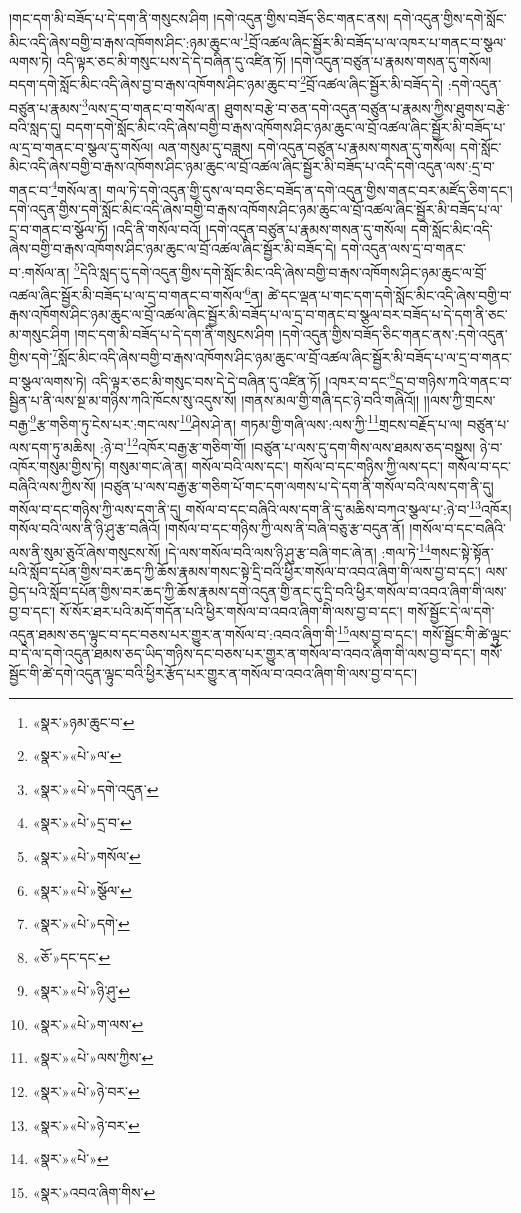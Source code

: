 །གང་དག་མི་བཟོད་པ་དེ་དག་ནི་གསུངས་ཤིག །དགེ་འདུན་གྱིས་བཟོད་ཅིང་གནང་ནས། དགེ་འདུན་གྱིས་དགེ་སློང་མིང་འདི་ཞེས་བགྱི་བ་རྒས་འཁོགས་ཤིང་:ཉམ་ཆུང་ལ་\footnote{«སྣར་»ཉམ་ཆུང་བ་}བྲོ་འཚལ་ཞིང་སྦྱོར་མི་བཟོད་པ་ལ་འཁར་པ་གནང་བ་སྩལ་ལགས་ཏེ། འདི་ལྟར་ཅང་མི་གསུང་པས་དེ་དེ་བཞིན་དུ་འཛིན་ཏོ། །དགེ་འདུན་བཙུན་པ་རྣམས་གསན་དུ་གསོལ། བདག་དགེ་སློང་མིང་འདི་ཞེས་བྱ་བ་རྒས་འཁོགས་ཤིང་ཉམ་ཆུང་བ་\footnote{«སྣར་»«པེ་»ལ་}བྲོ་འཚལ་ཞིང་སྦྱོར་མི་བཟོད་དེ། :དགེ་འདུན་བཙུན་པ་རྣམས་\footnote{«སྣར་»«པེ་»དགེ་འདུན་}ལས་དྲ་བ་གནང་བ་གསོལ་ན། ཐུགས་བརྩེ་བ་ཅན་དགེ་འདུན་བཙུན་པ་རྣམས་ཀྱིས་ཐུགས་བརྩེ་བའི་སླད་དུ། བདག་དགེ་སློང་མིང་འདི་ཞེས་བགྱི་བ་རྒས་འཁོགས་ཤིང་ཉམ་ཆུང་ལ་བྲོ་འཚལ་ཞིང་སྦྱོར་མི་བཟོད་པ་ལ་དྲ་བ་གནང་བ་སྩལ་དུ་གསོལ། ལན་གསུམ་དུ་བཟླས། དགེ་འདུན་བཙུན་པ་རྣམས་གསན་དུ་གསོལ། དགེ་སློང་མིང་འདི་ཞེས་བགྱི་བ་རྒས་འཁོགས་ཤིང་ཉམ་ཆུང་ལ་བྲོ་འཚལ་ཞིང་སྦྱོར་མི་བཟོད་པ་འདི་དགེ་འདུན་ལས་:དྲ་བ་གནང་བ་\footnote{«སྣར་»«པེ་»དྲ་བ་}གསོལ་ན། གལ་ཏེ་དགེ་འདུན་གྱི་དུས་ལ་བབ་ཅིང་བཟོད་ན་དགེ་འདུན་གྱིས་གནང་བར་མཛོད་ཅིག་དང་། དགེ་འདུན་གྱིས་དགེ་སློང་མིང་འདི་ཞེས་བགྱི་བ་རྒས་འཁོགས་ཤིང་ཉམ་ཆུང་ལ་བྲོ་འཚལ་ཞིང་སྦྱོར་མི་བཟོད་པ་ལ་དྲ་བ་གནང་བ་སྩོལ་ཏོ། །འདི་ནི་གསོལ་བའོ། །དགེ་འདུན་བཙུན་པ་རྣམས་གསན་དུ་གསོལ། དགེ་སློང་མིང་འདི་ཞེས་བགྱི་བ་རྒས་འཁོགས་ཤིང་ཉམ་ཆུང་ལ་བྲོ་འཚལ་ཞིང་སྦྱོར་མི་བཟོད་དེ། དགེ་འདུན་ལས་དྲ་བ་གནང་བ་:གསོལ་ན། \footnote{«སྣར་»«པེ་»གསོལ་}དེའི་སླད་དུ་དགེ་འདུན་གྱིས་དགེ་སློང་མིང་འདི་ཞེས་བགྱི་བ་རྒས་འཁོགས་ཤིང་ཉམ་ཆུང་ལ་བྲོ་འཚལ་ཞིང་སྦྱོར་མི་བཟོད་པ་ལ་དྲ་བ་གནང་བ་གསོལ་\footnote{«སྣར་»«པེ་»སྩོལ་}ན། ཚེ་དང་ལྡན་པ་གང་དག་དགེ་སློང་མིང་འདི་ཞེས་བགྱི་བ་རྒས་འཁོགས་ཤིང་ཉམ་ཆུང་ལ་བྲོ་འཚལ་ཞིང་སྦྱོར་མི་བཟོད་པ་ལ་དྲ་བ་གནང་བ་སྩལ་བར་བཟོད་པ་དེ་དག་ནི་ཅང་མ་གསུང་ཤིག །གང་དག་མི་བཟོད་པ་དེ་དག་ནི་གསུངས་ཤིག །དགེ་འདུན་གྱིས་བཟོད་ཅིང་གནང་ནས་:དགེ་འདུན་གྱིས་དགེ་\footnote{«སྣར་»«པེ་»དགེ་}སློང་མིང་འདི་ཞེས་བགྱི་བ་རྒས་འཁོགས་ཤིང་ཉམ་ཆུང་ལ་བྲོ་འཚལ་ཞིང་སྦྱོར་མི་བཟོད་པ་ལ་དྲ་བ་གནང་བ་སྩལ་ལགས་ཏེ། འདི་ལྟར་ཅང་མི་གསུང་བས་དེ་དེ་བཞིན་དུ་འཛིན་ཏོ། །འཁར་བ་དང་\footnote{«ཅོ་»དང་དང་}དྲ་བ་གཉིས་ཀའི་གནང་བ་སྦྱིན་པ་ནི་ལས་སྔ་མ་གཉིས་ཀའི་ཁོངས་སུ་འདུས་སོ། །གནས་མལ་གྱི་གཞི་དང་ཉེ་བའི་གཞིའོ།། །།ལས་ཀྱི་གྲངས་བརྒྱ་\footnote{«སྣར་»«པེ་»ཉི་ཤུ་}རྩ་གཅིག་ཏུ་ངེས་པར་:གང་ལས་\footnote{«སྣར་»«པེ་»ག་ལས་}ཤེས་ཤེ་ན། གཏམ་གྱི་གཞི་ལས་:ལས་ཀྱི་\footnote{«སྣར་»«པེ་»ལས་ཀྱིས་}གྲངས་བརྗོད་པ་ལ། བཙུན་པ་ལས་དག་ཏུ་མཆིས། :ཉེ་བ་\footnote{«སྣར་»«པེ་»ཉེ་བར་}འཁོར་བརྒྱ་རྩ་གཅིག་གོ། །བཙུན་པ་ལས་དུ་དག་གིས་ལས་ཐམས་ཅད་བསྡུས། ཉེ་བ་འཁོར་གསུམ་གྱིས་ཏེ། གསུམ་གང་ཞེ་ན། གསོལ་བའི་ལས་དང་། གསོལ་བ་དང་གཉིས་ཀྱི་ལས་དང་། གསོལ་བ་དང་བཞིའི་ལས་ཀྱིས་སོ། །བཙུན་པ་ལས་བརྒྱ་རྩ་གཅིག་པོ་གང་དག་ལགས་པ་དེ་དག་ནི་གསོལ་བའི་ལས་དག་ནི་དུ། གསོལ་བ་དང་གཉིས་ཀྱི་ལས་དག་ནི་དུ། གསོལ་བ་དང་བཞིའི་ལས་དག་ནི་དུ་མཆིས་བཀའ་སྩལ་པ་:ཉེ་བ་\footnote{«སྣར་»«པེ་»ཉེ་བར་}འཁོར། གསོལ་བའི་ལས་ནི་ཉི་ཤུ་རྩ་བཞིའོ། །གསོལ་བ་དང་གཉིས་ཀྱི་ལས་ནི་བཞི་བཅུ་རྩ་བདུན་ནོ། །གསོལ་བ་དང་བཞིའི་ལས་ནི་སུམ་ཅུའོ་ཞེས་གསུངས་སོ། །དེ་ལས་གསོལ་བའི་ལས་ཉི་ཤུ་རྩ་བཞི་གང་ཞེ་ན། :གལ་ཏེ་\footnote{«སྣར་»«པེ་»}གསང་སྟེ་སྟོན་པའི་སློབ་དཔོན་གྱིས་བར་ཆད་ཀྱི་ཆོས་རྣམས་གསང་སྟེ་དྲི་བའི་ཕྱིར་གསོལ་བ་འབའ་ཞིག་གི་ལས་བྱ་བ་དང་། ལས་བྱེད་པའི་སློབ་དཔོན་གྱིས་བར་ཆད་ཀྱི་ཆོས་རྣམས་དགེ་འདུན་གྱི་ནང་དུ་དྲི་བའི་ཕྱིར་གསོལ་བ་འབའ་ཞིག་གི་ལས་བྱ་བ་དང་། སོ་སོར་ཐར་པའི་མདོ་གདོན་པའི་ཕྱིར་གསོལ་བ་འབའ་ཞིག་གི་ལས་བྱ་བ་དང་། གསོ་སྦྱོང་དེ་ལ་དགེ་འདུན་ཐམས་ཅད་ལྟུང་བ་དང་བཅས་པར་གྱུར་ན་གསོལ་བ་:འབའ་ཞིག་གི་\footnote{«སྣར་»འབའ་ཞིག་གིས་}ལས་བྱ་བ་དང་། གསོ་སྦྱོང་གི་ཚེ་ལྟུང་བ་དེ་ལ་དགེ་འདུན་ཐམས་ཅད་ཡིད་གཉིས་དང་བཅས་པར་གྱུར་ན་གསོལ་བ་འབའ་ཞིག་གི་ལས་བྱ་བ་དང་། གསོ་སྦྱོང་གི་ཚེ་དགེ་འདུན་ལྟུང་བའི་ཕྱིར་རྩོད་པར་གྱུར་ན་གསོལ་བ་འབའ་ཞིག་གི་ལས་བྱ་བ་དང་། 